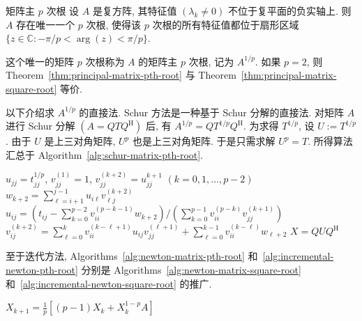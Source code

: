 \begin{Theorem}{{矩阵主 $p$ 次根}}\label{thm:principal-matrix-pth-root}
{设 $A$ 是复方阵, 其特征值 $(\lambda_k\ne0)$ 不位于复平面的负实轴上. 则 $A$ 存在唯一一个 $p$ 次根, 使得该 $p$ 次根的所有特征值都位于扇形区域 $\{z\in\mathbb{C}:-\pi/p<\arg(z)<\pi/p\}$.}
\end{Theorem}

{这个唯一的矩阵 $p$ 次根称为 $A$ 的矩阵主 $p$ 次根, 记为 $A^{1/p}$. 如果 $p=2$, 则 Theorem~\ref{thm:principal-matrix-pth-root} 与 Theorem~\ref{thm:principal-matrix-square-root} 等价.}

{以下介绍求 $A^{1/p}$ 的直接法. Schur 方法是一种基于 Schur 分解的直接法. 对矩阵 $A$ 进行 Schur 分解 $(A=QTQ^{\mathrm H})$ 后, 有 $A^{1/p}=QT^{1/p}Q^{\mathrm H}$. 为求得 $T^{1/p}$, 设 $U:=T^{1/p}$. 由于 $U$ 是上三对角矩阵, $U^p$ 也是上三对角矩阵. 于是只需求解 $U^p=T$. 所得算法汇总于 Algorithm~\ref{alg:schur-matrix-pth-root}.}

\begin{algorithm}[H]\caption{{(直接法) 求 $X=A^{1/p}$ 的 Schur 方法}}\label{alg:schur-matrix-pth-root}\begin{algorithmic}[1]
\State $u_{jj}=t_{jj}^{1/p}$, $v_{jj}^{(1)}=1$, $v_{jj}^{(k+2)}=u_{jj}^{k+1}$ $(k=0,1,\ldots,p-2)$
\State $w_{k+2}=\sum_{\ell=i+1}^{j-1}u_{i\ell}v_{\ell j}^{(k+2)}$
\EndFor
\State $u_{ij}=(t_{ij}-\sum_{k=0}^{p-2}v_{ii}^{(p-k-1)}w_{k+2})/(\sum_{k=0}^{p-1}v_{ii}^{(p-k)}v_{jj}^{(k+1)})$
\State $v_{ij}^{(k+2)}=\sum_{\ell=0}^k v_{ii}^{(k-\ell+1)}u_{ij}v_{jj}^{(\ell+1)}+\sum_{\ell=0}^{k-1}v_{ii}^{(k-\ell)}w_{\ell+2}$
\EndFor
\EndFor
\EndFor
\State $X=QUQ^{\mathrm H}$
\end{algorithmic}\end{algorithm}

{至于迭代方法, Algorithms~\ref{alg:newton-matrix-pth-root} 和~\ref{alg:incremental-newton-pth-root} 分别是 Algorithms~\ref{alg:newton-matrix-square-root} 和~\ref{alg:incremental-newton-square-root} 的推广.}

\begin{algorithm}[H]\caption{{(迭代法) 求 $A^{1/p}$ 的 Newton 方法}}\label{alg:newton-matrix-pth-root}\begin{algorithmic}[1]
\State $X_{k+1}=\frac{1}{p}[(p-1)X_k+X_k^{1-p}A]$
\EndFor
\end{algorithmic}\end{algorithm}

